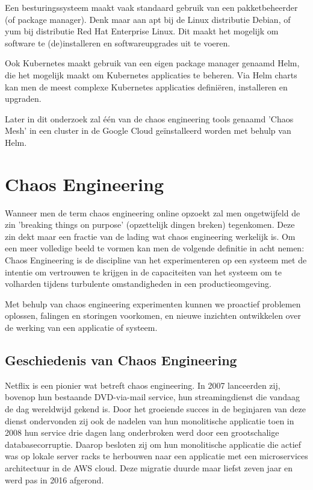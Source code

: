 Een besturingssysteem maakt vaak standaard gebruik van een pakketbeheerder (of package manager). Denk maar aan apt bij de Linux distributie Debian, of yum bij distributie Red Hat Enterprise Linux. Dit maakt het mogelijk om software te (de)installeren en softwareupgrades uit te voeren.

Ook Kubernetes maakt gebruik van een eigen package manager genaamd Helm, die het mogelijk maakt om Kubernetes applicaties te beheren. Via Helm charts kan men de meest complexe Kubernetes applicaties definiëren, installeren en upgraden.

Later in dit onderzoek zal één van de chaos engineering tools genaamd 'Chaos Mesh' in een cluster in de Google Cloud geïnstalleerd worden met behulp van Helm.  

\section{Chaos Engineering}
\label{ch:chaos}

Wanneer men de term chaos engineering online opzoekt zal men ongetwijfeld de zin 'breaking things on purpose' (opzettelijk dingen breken) tegenkomen. Deze zin dekt maar een fractie van de lading wat chaos engineering werkelijk is. Om een meer volledige beeld te vormen kan men de volgende definitie in acht nemen: Chaos Engineering is de discipline van het experimenteren op een systeem met de intentie om vertrouwen te krijgen in de capaciteiten van het systeem om te volharden tijdens turbulente omstandigheden in een productieomgeving. \autocite{Eliot2019}

Met behulp van chaos engineering experimenten kunnen we proactief problemen oplossen, falingen en storingen voorkomen, en nieuwe inzichten ontwikkelen over de werking van een applicatie of systeem.  

\subsection{Geschiedenis van Chaos Engineering}

Netflix is een pionier wat betreft chaos engineering. In 2007 lanceerden zij, bovenop hun bestaande DVD-via-mail service, hun streamingdienst die vandaag de dag wereldwijd gekend is. Door het groeiende succes in de beginjaren van deze dienst ondervonden zij ook de nadelen van hun monolitische applicatie toen in 2008 hun service drie dagen lang onderbroken werd door een grootschalige databasecorruptie. 
Daarop besloten zij om hun monolitische applicatie die actief was op lokale server racks te herbouwen naar een applicatie met een microservices architectuur in de AWS cloud. Deze migratie duurde maar liefst zeven jaar en werd pas in 2016 afgerond.

